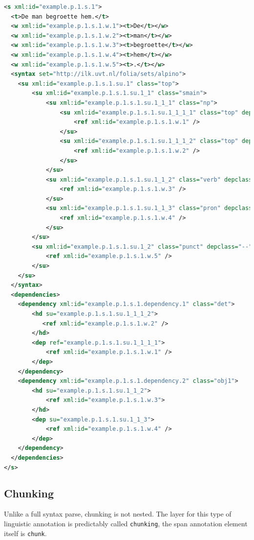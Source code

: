 \documentclass[a4paper,12pt]{report}
\begin{document}
\begin{lstlisting}[language=xml]
<s xml:id="example.p.1.s.1">
  <t>De man begroette hem.</t>
  <w xml:id="example.p.1.s.1.w.1"><t>De</t></w>
  <w xml:id="example.p.1.s.1.w.2"><t>man</t></w>
  <w xml:id="example.p.1.s.1.w.3"><t>begroette</t></w>
  <w xml:id="example.p.1.s.1.w.4"><t>hem</t></w>
  <w xml:id="example.p.1.s.1.w.5"><t>.</t></w>
  <syntax set="http://ilk.uvt.nl/folia/sets/alpino">
    <su xml:id="example.p.1.s.1.su.1" class="top">     
        <su xml:id="example.p.1.s.1.su.1_1" class="smain">     
            <su xml:id="example.p.1.s.1.su.1_1_1" class="np">     
                <su xml:id="example.p.1.s.1.su.1_1_1_1" class="top" depclass="det">     
                    <ref xml:id="example.p.1.s.1.w.1" />       
                </su>
                <su xml:id="example.p.1.s.1.su.1_1_1_2" class="top" depclass="hd">     
                    <ref xml:id="example.p.1.s.1.w.2" />
                </su> 
            </su>
            <su xml:id="example.p.1.s.1.su.1_1_2" class="verb" depclass="hd">     
                <ref xml:id="example.p.1.s.1.w.3" />   
            </su>
            <su xml:id="example.p.1.s.1.su.1_1_3" class="pron" depclass="obj1">     
                <ref xml:id="example.p.1.s.1.w.4" />   
            </su>
        </su>
        <su xml:id="example.p.1.s.1.su.1_2" class="punct" depclass="--">
            <ref xml:id="example.p.1.s.1.w.5" />               
        </su> 
    </su>
  </syntax>
  <dependencies>
    <dependency xml:id="example.p.1.s.1.dependency.1" class="det">
        <hd su="example.p.1.s.1.su.1_1_1_2">
           <ref xml:id="example.p.1.s.1.w.2" />   
        </hd>
        <dep ref="example.p.1.s.1.su.1_1_1_1">
            <ref xml:id="example.p.1.s.1.w.1" />   
        </dep>
    </dependency>
    <dependency xml:id="example.p.1.s.1.dependency.2" class="obj1">
        <hd su="example.p.1.s.1.su.1_1_2">
            <ref xml:id="example.p.1.s.1.w.3">
        </hd>
        <dep su="example.p.1.s.1.su.1_1_3">
            <ref xml:id="example.p.1.s.1.w.4" />   
        </dep>
    </dependency>
  </dependencies>
</s>
\end{lstlisting}

\subsection{Chunking}

Unlike a full syntax parse, chunking is not nested. The layer for this type of linguistic annotation is predictably called \texttt{chunking}, the span annotation element itself is \texttt{chunk}.
\end{document}
